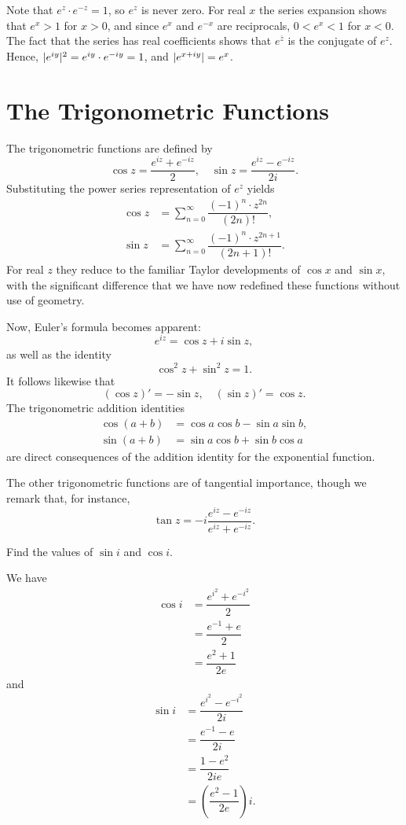 Note that $e^z \cdot e^{-z}=1$, so $e^z$ is never zero. For real $x$ the series expansion shows that $e^x>1$ for $x>0$, and since $e^x$ and $e^{-x}$ are reciprocals, $0<e^x<1$ for $x<0$. The fact that the series has real coefficients shows that $e^{\overline{z}}$ is the conjugate of $e^z$. Hence, $\lvert e^{iy} \rvert^2=e^{iy} \cdot e^{-iy}=1$, and $\lvert e^{x+iy} \rvert=e^x$.

\section{The Trigonometric Functions}
The trigonometric functions are defined by $$\cos z=\dfrac{e^{iz}+e^{-iz}}{2}, \quad \sin z=\dfrac{e^{iz}-e^{-iz}}{2i}.$$ Substituting the power series representation of $e^z$ yields
\begin{align*}
	\cos z &=\sum_{n=0}^{\infty} \dfrac{(-1)^n \cdot z^{2n}}{(2n)!}, \\
	\sin z &=\sum_{n=0}^{\infty} \dfrac{(-1)^n \cdot z^{2n+1}}{(2n+1)!}.
\end{align*}
For real $z$ they reduce to the familiar Taylor developments of $\cos x$ and $\sin x$, with the significant difference that we have now redefined these functions without use of geometry.

Now, Euler's formula becomes apparent: $$e^{iz}=\cos z+i \sin z,$$ as well as the identity $$\cos^2 z+\sin^2 z=1.$$ It follows likewise that $$(\cos z)'=-\sin z, \quad (\sin z)'=\cos z.$$ The trigonometric addition identities
\begin{align*}
	\cos(a+b) &=\cos a \cos b-\sin a \sin b, \\
	\sin(a+b) &=\sin a \cos b+\sin b \cos a
\end{align*}
 are direct consequences of the addition identity for the exponential function.
 
 The other trigonometric functions are of tangential importance, though we remark that, for instance, $$\tan z=-i \dfrac{e^{iz}-e^{-iz}}{e^{iz}+e^{-iz}}.$$
 
 \begin{exercise}
 	Find the values of $\sin i$ and $\cos i$.
 	
 	\begin{sol}
 		We have
 		\begin{align*}
 			\cos i &=\dfrac{e^{i^2}+e^{-i^2}}{2} \\
 			&=\dfrac{e^{-1}+e}{2} \\
 			&=\dfrac{e^2+1}{2e}
 		\end{align*}
 		and
 		\begin{align*}
 			\sin i &=\dfrac{e^{i^2}-e^{-i^2}}{2i} \\
 			&=\dfrac{e^{-1}-e}{2i} \\
 			&=\dfrac{1-e^2}{2ie} \\
 			&=\left(\dfrac{e^2-1}{2e}\right)i.
 		\end{align*}
 	\end{sol}
 \end{exercise}
 
